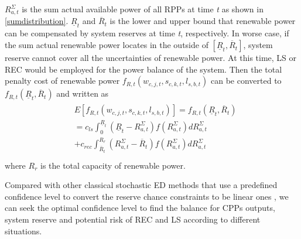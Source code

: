 $R_{a,t}^{\Sigma}$ is the sum actual available power of all RPPs at time {\it t} as shown in \eqref{sumdistribution}. $\underline{R}_{t}$ and $\overline{R}_{t}$ is the lower and upper bound that renewable power can be compensated by system reserves at time {\it t}, respectively. In worse case, if the sum actual renewable power locates in the outside of $[\underline{R}_{t}, \overline{R}_{t}]$, system reserve cannot cover all the uncertainties of renewable power. At this time, LS or REC would be employed for the power balance of the system. Then the total penalty cost of renewable power $f_{R,t}(w_{c,j,t},s_{c,k,t},l_{s,b,t})$ can be converted to $f_{R,t}(\underline{R}_{t},\overline{R}_{t})$ and written as
\begin{equation} \label{DB_4}
\begin{aligned}
\begin{aligned}
& E[f_{R,t}(w_{c,j,t},s_{c,k,t},l_{s,b,t})]=f_{R,t}(\underline{R}_{t},\overline{R}_{t})\\
& =c_{ls}\int_{0}^{\underline{R}_{t}}(\underline{R}_{t}-R_{a,t}^{\Sigma})f(R_{a,t}^{\Sigma})dR_{a,t}^{\Sigma}\\
& +c_{rec}\int_{\overline{R}_{t}}^{R_{r}}(R_{a,t}^{\Sigma}-\overline{R}_{t})f(R_{a,t}^{\Sigma})dR_{a,t}^{\Sigma}\\
\end{aligned}
\end{aligned}
\end{equation}
where $R_{r}$ is the total capacity of renewable power.

Compared with other classical stochastic ED methods that use a predefined confidence level to convert the reserve chance constraints to be linear ones \cite{Versatile}\cite{chance_constrain}\cite{ST_ED}, we can seek the optimal confidence level to find the balance for CPPs outputs, system reserve and potential risk of REC and LS according to different situations.


